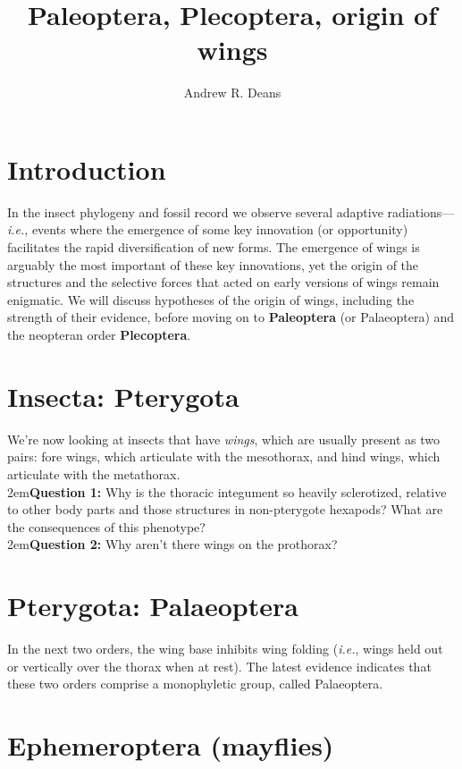 \documentclass[letterpaper, 11pt]{article}
\title{Paleoptera, Plecoptera, origin of wings}
\author{Andrew R. Deans}
\begin{document}
\cleanlookdateon %
\maketitle
\thispagestyle{fancy}
\section*{Introduction}
In the insect phylogeny and fossil record we observe several adaptive radiations---\textit{i.e.}, events where the emergence of some key innovation (or opportunity) facilitates the rapid diversification of new forms. The emergence of wings is arguably the most important of these key innovations, yet the origin of the structures and the selective forces that acted on early versions of wings remain enigmatic. We will discuss hypotheses of the origin of wings, including the strength of their evidence, before moving on to \textbf{Paleoptera} (or Palaeoptera) and the neopteran order \textbf{Plecoptera}.

\section*{Insecta: Pterygota}
We're now looking at insects that have \textit{wings}, which are usually present as two pairs: fore wings, which articulate with the mesothorax, and hind wings, which articulate with the metathorax.\\

\hangindent2em\textbf{Question 1:} Why is the thoracic integument so heavily sclerotized, relative to other body parts and those structures in non-pterygote hexapods? What are the consequences of this phenotype?\\

\hangindent2em\textbf{Question 2:} Why aren't there wings on the prothorax?

\section*{Pterygota: Palaeoptera}
In the next two orders, the wing base inhibits wing folding (\textit{i.e.}, wings held out or vertically over the thorax when at rest). The latest evidence indicates that these two orders comprise a monophyletic group, called Palaeoptera.

\section{Ephemeroptera (mayflies)}
\end{document}
